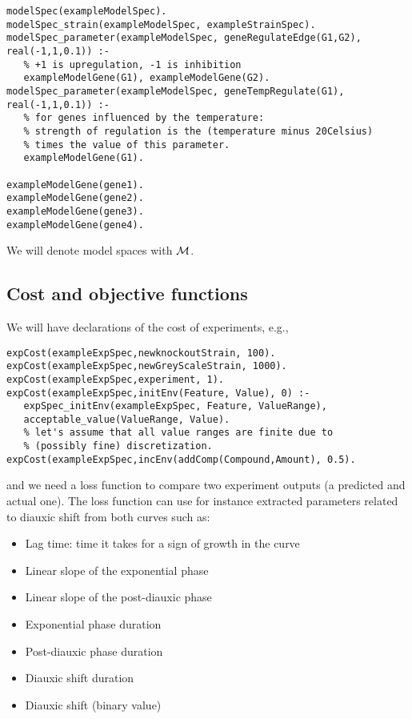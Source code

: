 \documentclass{article}
\begin{document}
\begin{verbatim}
modelSpec(exampleModelSpec).
modelSpec_strain(exampleModelSpec, exampleStrainSpec). 
modelSpec_parameter(exampleModelSpec, geneRegulateEdge(G1,G2), real(-1,1,0.1)) :-
   % +1 is upregulation, -1 is inhibition
   exampleModelGene(G1), exampleModelGene(G2).
modelSpec_parameter(exampleModelSpec, geneTempRegulate(G1), real(-1,1,0.1)) :-
   % for genes influenced by the temperature:
   % strength of regulation is the (temperature minus 20Celsius)
   % times the value of this parameter.
   exampleModelGene(G1).

exampleModelGene(gene1).
exampleModelGene(gene2).
exampleModelGene(gene3).
exampleModelGene(gene4).
\end{verbatim}

We will denote model spaces with $\mathcal{M}$.

\subsection{Cost and objective functions}

We will have declarations of the cost of experiments, e.g.,

\begin{verbatim}
expCost(exampleExpSpec,newknockoutStrain, 100).
expCost(exampleExpSpec,newGreyScaleStrain, 1000).
expCost(exampleExpSpec,experiment, 1).
expCost(exampleExpSpec,initEnv(Feature, Value), 0) :-
   expSpec_initEnv(exampleExpSpec, Feature, ValueRange),
   acceptable_value(ValueRange, Value). 
   % let's assume that all value ranges are finite due to 
   % (possibly fine) discretization.
expCost(exampleExpSpec,incEnv(addComp(Compound,Amount), 0.5).
\end{verbatim}

and we need a loss function to compare two experiment outputs (a predicted and actual one).
The loss function can use for instance extracted parameters related to diauxic shift from both curves such as: 
\begin{itemize}
 \item Lag time: time it takes for a sign of growth in the curve
 \item Linear slope of the exponential phase
 \item Linear slope of the post-diauxic phase
 \item Exponential phase duration
 \item Post-diauxic phase duration
 \item Diauxic shift duration
 \item Diauxic shift (binary value)
\end{itemize}
\end{document}
